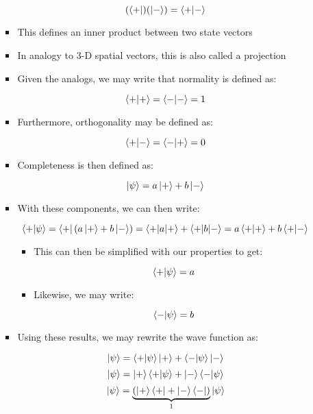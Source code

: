 \begin{itemize}
\begin{itemize}
\begin{itemize}
            $$(\bra{+})(\ket{-})=\bra{+}\ket{-}$$

          \item This defines an inner product between two state vectors

          \item In analogy to 3-D spatial vectors, this is also called a projection

          \item Given the analogs, we may write that normality is defined as:

            $$\braket{+}=\braket{-}=1$$

          \item Furthermore, orthogonality may be defined as:

            $$\bra{+}\ket{-}=\bra{-}\ket{+}=0$$

          \item Completeness is then defined as:

            $$\ket{\psi}=a\ket{+}+b\ket{-}$$

          \item With these components, we can then write:

            $$\bra{+}\ket{\psi}=\bra{+}(a\ket{+}+b\ket{-})=\bra{+|a}\ket{+}+\bra{+|b}\ket{-}=a\braket{+}+b\bra{+}\ket{-}$$

            \begin{itemize}

              \item This can then be simplified with our properties to get:

                $$\bra{+}\ket{\psi}=a$$

              \item Likewise, we may write:

                $$\bra{-}\ket{\psi}=b$$

            \end{itemize}

          \item Using these results, we may rewrite the wave function as:

            $$\ket{\psi}=\bra{+}\ket{\psi}\ket{+}+\bra{-}\ket{\psi}\ket{-}$$
            $$\ket{\psi}=\ket{+}\bra{+}\ket{\psi}+\ket{-}\bra{-}\ket{\psi}$$
            $$\ket{\psi}=\underbrace{(\ket{+}\bra{+}+\ket{-}\bra{-})}_1\ket{\psi}$$

            \begin{itemize}


\end{itemize}
\end{itemize}
\end{itemize}
\end{itemize}
